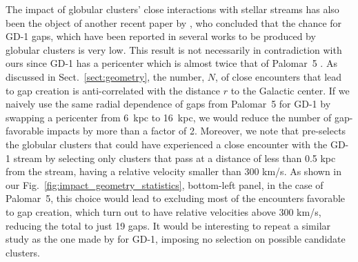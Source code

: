 \documentclass{aa}
\begin{document}
  The impact of globular clusters' close interactions with stellar streams has also been the object of another recent paper by \citet{2022ApJ...941..129D}, who concluded that the chance for GD-1 gaps, which have been reported in several works \citep[see, for example, ][]{2019ApJ...880...38B,2018MNRAS.477.1893D,2020AAS...23533607D} to be produced by globular clusters is very low. This result is not necessarily in contradiction with ours since GD-1 has a pericenter which is almost twice that of Palomar~5 \citep[see, for example][]{2019MNRAS.486.2995M}. As discussed in Sect.~\ref{sect:geometry}, the number, $N$, of close encounters that lead to gap creation is anti-correlated with the distance $r$ to the Galactic center. If we naively use the same radial dependence of gaps from Palomar~5 for GD-1 by swapping a pericenter from 6~kpc to 16~kpc, we would reduce the number of gap-favorable impacts by more than a factor of 2. Moreover, we note that \citet{2022ApJ...941..129D} pre-selects the globular clusters that could have experienced a close encounter with the GD-1 stream by selecting only clusters that pass at a distance of less than 0.5 kpc from the stream, having a relative velocity smaller than  300 km/s. As shown in our Fig.~\ref{fig:impact_geometry_statistics}, bottom-left panel, in the case of Palomar~5, this choice would lead to excluding most of the encounters favorable to gap creation, which turn out to have relative velocities above 300 km/s, reducing the total to just 19 gaps. It would be interesting to repeat a similar study as the one made by \citet{2022ApJ...941..129D} for GD-1, imposing no selection on possible candidate clusters.\\
  
\end{document}
